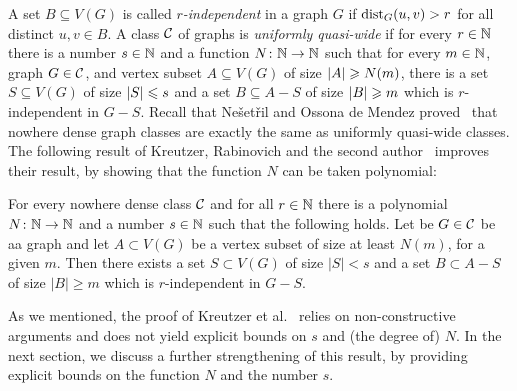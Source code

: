  

A set $B\subseteq V(G)$ is called {\em{$r$-independent}} in a graph $G$ if  $\mathrm{dist}_G(u,v)>r$ for all
distinct $u,v\in B$. 
A class $\mathcal{C}$ of graphs is \emph{uniformly quasi-wide} if for every $r\in \mathbb{N}$ there is a number $s\in \mathbb{N}$
and a function $N\colon\mathbb{N}\to\mathbb{N}$ such that
for every $m\in \mathbb{N}$, graph $G\in \mathcal{C}$, and vertex subset $A\subseteq V(G)$ of size $\left\lvert A\right\rvert\geqslant N(m)$, there is a set
$S\subseteq V(G)$ of size $\left\lvert S\right\rvert\leqslant s$ and a set
$B\subseteq A-S$ of size $\left\lvert B\right\rvert\geqslant m$ 
which is $r$-independent in $G-S$.
Recall that Ne\v set\v ril and Ossona de 
Mendez proved~\cite{nevsetvril2011nowhere} that nowhere dense graph classes are exactly the same as uniformly quasi-wide classes. 
The following result of Kreutzer, Rabinovich and the second author~\cite{siebertz2016polynomial}
improves their result, by showing that the function $N$ can be taken polynomial:

\begin{theorem}\label{thm:krs}
For every nowhere dense class $\mathcal{C}$
and for all $r\in \mathbb{N}$ there is a polynomial $N\colon \mathbb{N}\to\mathbb{N}$ 
and a number $s\in \mathbb{N}$ such that the following holds.
Let be $G\in \mathcal{C}$ be aa graph and let $A\subset V(G)$ be a vertex subset of size at least $N(m)$, for a given $m$.
Then there exists a set $S\subset V(G)$ of size $|S|<s$
and a set $B\subset A-S$ of size $|B|\ge m$ which is $r$-independent in $G-S$.	
\end{theorem}

As we mentioned, the proof of Kreutzer et al.~\cite{siebertz2016polynomial} relies on non-constructive arguments and does not yield explicit bounds on $s$ and (the degree of) $N$. 
In the next section, we discuss a further strengthening of this result, by providing explicit bounds on the function $N$ and the number $s$.